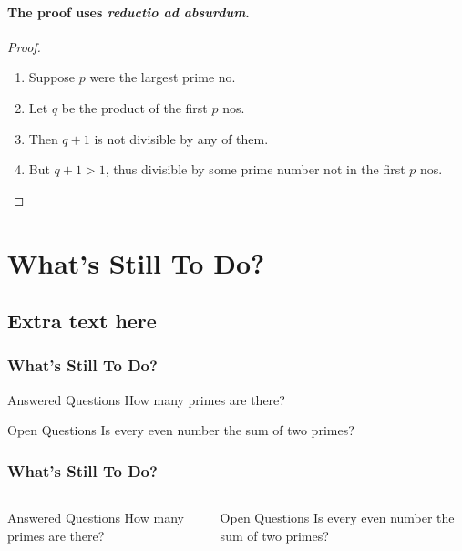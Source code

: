 \begin{frame}
\framesubtitle{The proof uses \textit{reductio ad absurdum}.}
\begin{proof}
\begin{enumerate}
\renewcommand{\theenumi}{\Alph{enumi}}
\item<1-> Suppose $p$ were the largest prime no.
\item<2-> Let $q$ be the product of the first $p$ nos.
\item<3-> Then $q + 1$ is not divisible by any of them.
\item<1-> But $q + 1 > 1$, thus divisible by some prime
number not in the first $p$ nos.\qedhere
\end{enumerate}
\end{proof}
\end{frame}

\section{What's Still To Do?}
\subsection{Extra text here}

\begin{frame}
\frametitle{What’s Still To Do?}
\begin{block}{Answered Questions}
How many primes are there?
\end{block}
\begin{block}{Open Questions}
Is every even number the sum of two primes?
\end{block}
\end{frame}

\begin{frame}
\frametitle{What’s Still To Do?}
\begin{columns}
\begin{column}{0.5\textwidth}
\begin{block}{Answered Questions}
How many primes are there?
\end{block}
\end{column}
\begin{block}{Open Questions}
Is every even number the sum of two primes?~\cite{Goldbach1742}
\end{block}
\end{columns}
\end{frame}

